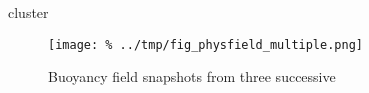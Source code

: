 
cluster



\begin{figure} %
\centering
\texttt{[image: \%
../tmp/fig\_physfield\_multiple.png]}
\caption{Buoyancy field snapshots from three successive}
\end{figure}
